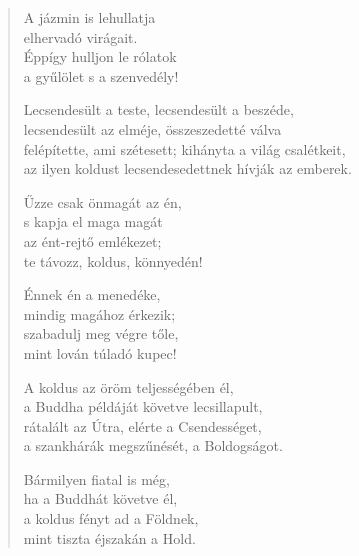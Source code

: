 \begin{verse}
 A jázmin is lehullatja\\
elhervadó virágait.\\
Éppígy hulljon le rólatok\\
a gyűlölet s a szenvedély!

 Lecsendesült a teste, lecsendesült a beszéde,\\
lecsendesült az elméje, összeszedetté válva\\
felépítette, ami szétesett; kihányta a világ csalétkeit,\\
az ilyen koldust lecsendesedettnek hívják az emberek.

 Űzze csak önmagát az én,\\
s kapja el maga magát\\
az ént-rejtő emlékezet;\\
te távozz, koldus, könnyedén!

 Énnek én a menedéke,\\
mindig magához érkezik;\\
szabadulj meg végre tőle,\\
mint lován túladó kupec!

 A koldus az öröm teljességében él,\\
a Buddha példáját követve lecsillapult,\\
rátalált az Útra, elérte a Csendességet,\\
a szankhárák megszűnését, a Boldogságot.

 Bármilyen fiatal is még,\\
ha a Buddhát követve él,\\
a koldus fényt ad a Földnek,\\
mint tiszta éjszakán a Hold.

\end{verse}
